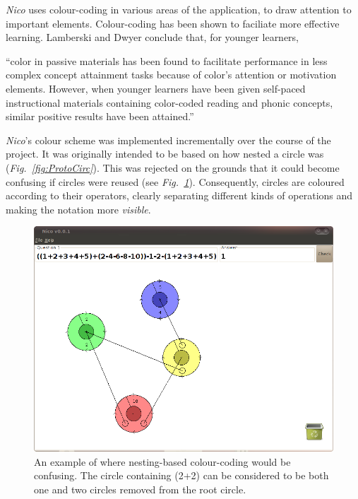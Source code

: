 \documentclass[12pt,twoside,notitlepage,xetex]{report}
\begin{document}
{%
\emph{Nico} uses colour-coding in various areas of the application, to draw attention to important elements.  Colour-coding has been shown to faciliate more effective learning.  Lamberski and Dwyer conclude that, for younger learners,
\begin{center}
\parbox[c]{\textwidth-2cm}{
\small
``color in passive materials has been found to facilitate performance in less complex concept attainment tasks because of color's attention or motivation elements.  However, when younger learners have been given self-paced instructional materials containing color-coded reading and phonic concepts, similar positive results have been attained.'' \cite{Lamberski1983}
}
\end{center}
\emph{Nico}'s colour scheme was implemented incrementally over the course of the project.  It was originally intended to be based on how nested a circle was (\emph{Fig.~\ref{fig:ProtoCirc}}).  This was rejected on the grounds that it could become confusing if circles were reused (see \emph{Fig.~\ref{fig:Nico2}}).  Consequently, circles are coloured according to their operators, clearly separating different kinds of operations and making the notation more \emph{visible}.

\begin{center}
\begin{figure}[H]
\begin{center}
\includegraphics[width=\textwidth-2cm]{figs/nico_screen_02.png}
\end{center}
\caption{An example of where nesting-based colour-coding would be confusing.  The circle containing (2+2) can be considered to be both one and two circles removed from the root circle.}
\label{fig:Nico2}
\end{figure}
\end{center}

}
\end{document}
